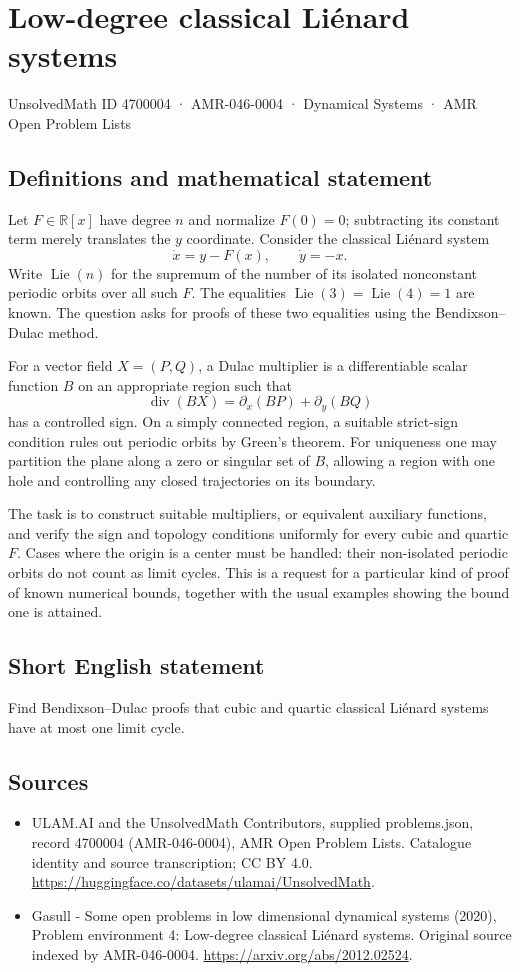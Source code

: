 \documentclass[11pt,a4paper]{article}
\begin{document}
\section*{Low-degree classical Liénard systems}\label{4700004}
{\small UnsolvedMath ID 4700004 · AMR-046-0004 · Dynamical Systems · AMR Open Problem Lists}
\subsection{Definitions and mathematical statement}
Let $F\in\mathbb R[x]$ have degree $n$ and normalize $F(0)=0$; subtracting its
constant term merely translates the $y$ coordinate. Consider the classical
Liénard system
\[
 \dot x=y-F(x),\qquad \dot y=-x.
\]
Write $\operatorname{Lie}(n)$ for the supremum of the number of its isolated
nonconstant periodic orbits over all such $F$. The equalities
$\operatorname{Lie}(3)=\operatorname{Lie}(4)=1$ are known. The question asks
for proofs of these two equalities using the Bendixson–Dulac method.

For a vector field $X=(P,Q)$, a Dulac multiplier is a differentiable scalar
function $B$ on an appropriate region such that
\[
 \operatorname{div}(BX)=\partial_x(BP)+\partial_y(BQ)
\]
has a controlled sign. On a simply connected region, a suitable strict-sign
condition rules out periodic orbits by Green's theorem. For uniqueness one
may partition the plane along a zero or singular set of $B$, allowing a
region with one hole and controlling any closed trajectories on its boundary.

The task is to construct suitable multipliers, or equivalent auxiliary
functions, and verify the sign and topology conditions uniformly for every
cubic and quartic $F$. Cases where the origin is a center must be handled:
their non-isolated periodic orbits do not count as limit cycles. This is a
request for a particular kind of proof of known numerical bounds, together
with the usual examples showing the bound one is attained.
\subsection{Short English statement}
Find Bendixson–Dulac proofs that cubic and quartic classical Liénard systems have at most one limit cycle.
\subsection{Sources}
\begin{itemize}
\item[S1] ULAM.AI and the UnsolvedMath Contributors, supplied problems.json, record 4700004 (AMR-046-0004), AMR Open Problem Lists. Catalogue identity and source transcription; CC BY 4.0.
\url{https://huggingface.co/datasets/ulamai/UnsolvedMath}.
\item[S2] Gasull - Some open problems in low dimensional dynamical systems (2020), Problem environment 4: Low-degree classical Liénard systems. Original source indexed by AMR-046-0004.
\url{https://arxiv.org/abs/2012.02524}.
\end{itemize}
\end{document}

